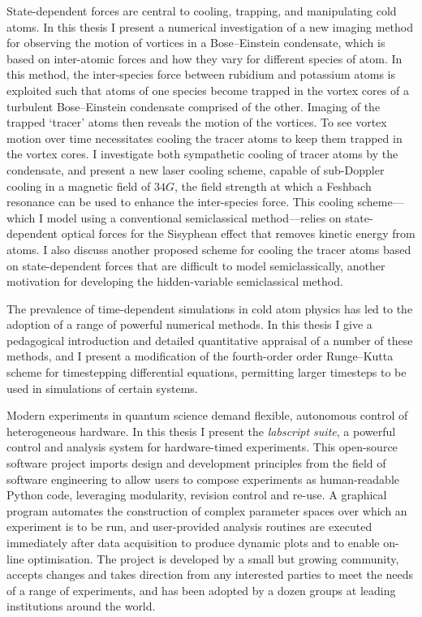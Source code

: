 State-dependent forces are central to cooling, trapping, and manipulating cold atoms. In this thesis I present a numerical investigation of a new imaging method for observing the motion of vortices in a Bose--Einstein condensate, which is based on inter-atomic forces and how they vary for different species of atom. In this method, the inter-species force between rubidium and potassium atoms is exploited such that atoms of one species become trapped in the vortex cores of a turbulent Bose--Einstein condensate comprised of the other. Imaging of the trapped `tracer' atoms then reveals the motion of the vortices. To see vortex motion over time necessitates cooling the tracer atoms to keep them trapped in the vortex cores. I investigate both sympathetic cooling of tracer atoms by the condensate, and present a new laser cooling scheme, capable of sub-Doppler cooling in a magnetic field of $34\unit{G}$, the field strength at which a Feshbach resonance can be used to enhance the inter-species force. This cooling scheme---which I model using a conventional semiclassical method---relies on state-dependent optical forces for the Sisyphean effect that removes kinetic energy from atoms. I also discuss another proposed scheme for cooling the tracer atoms based on state-dependent forces that are difficult to model semiclassically, another motivation for developing the hidden-variable semiclassical method.

The prevalence of time-dependent simulations in cold atom physics has led to the adoption of a range of powerful numerical methods. In this thesis I give a pedagogical introduction and detailed quantitative appraisal of a number of these methods, and I present a modification of the fourth-order order Runge--Kutta scheme for timestepping differential equations, permitting larger timesteps to be used in simulations of certain systems.

Modern experiments in quantum science demand flexible, autonomous control of heterogeneous hardware. In this thesis I present the \emph{labscript suite}, a powerful control and analysis system for hardware-timed experiments. This open-source software project imports design and development principles from the field of software engineering to allow users to compose experiments as human-readable Python code, leveraging modularity, revision control and re-use. A graphical program automates the construction of complex parameter spaces over which an experiment is to be run, and user-provided analysis routines are executed immediately after data acquisition to produce dynamic plots and to enable on-line optimisation. The project is developed by a small but growing community, accepts changes and takes direction from any interested parties to meet the needs of a range of experiments, and has been adopted by a dozen groups at leading institutions around the world.



